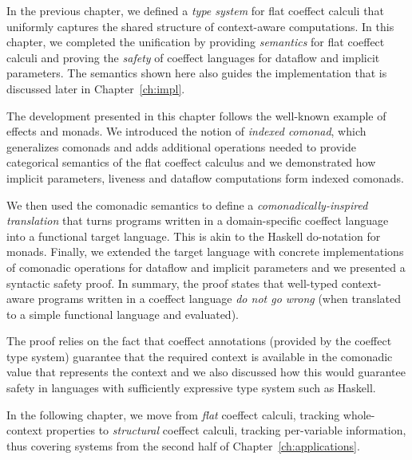In the previous chapter, we defined a \emph{type system} for flat coeffect calculi that uniformly
captures the shared structure of context-aware computations. In this chapter, we completed
the unification by providing \emph{semantics} for flat coeffect calculi and proving the
\emph{safety} of coeffect languages for dataflow and implicit parameters. The semantics shown
here also guides the implementation that is discussed later in Chapter~\ref{ch:impl}.

The development presented in this chapter follows the well-known example of effects and monads.
We introduced the notion of \emph{indexed comonad}, which generalizes comonads
and adds additional operations needed to provide categorical semantics of the flat coeffect
calculus and we demonstrated how implicit parameters, liveness and dataflow computations form
indexed comonads.

We then used the comonadic semantics to define a \emph{comonadically-inspired translation}
that turns programs written in a domain-specific coeffect language into a functional target
language. This is akin to the Haskell do-notation for monads. Finally, we extended the target
language with concrete implementations of comonadic operations for dataflow and implicit parameters
and we presented a syntactic safety proof. In summary, the proof states that well-typed
context-aware programs written in a coeffect language \emph{do not go wrong} (when translated
to a simple functional language and evaluated).

The proof relies on the fact that coeffect annotations (provided by the coeffect type system)
guarantee that the required context is available in the comonadic value that represents the
context and we also discussed how this would guarantee safety in languages with sufficiently
expressive type system such as Haskell.

In the following chapter, we move from \emph{flat} coeffect calculi, tracking whole-context
properties to \emph{structural} coeffect calculi, tracking per-variable information, thus
covering systems from the second half of Chapter~\ref{ch:applications}.
